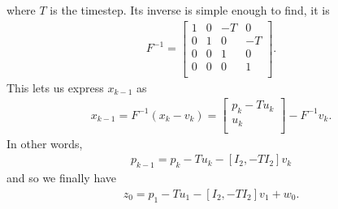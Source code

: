 \documentclass[]{article}
\begin{document}
where $T$ is the timestep. Its inverse is simple enough to find, it is
\begin{equation}\begin{aligned}
F^{-1} =
\begin{bmatrix}
1 & 0 & -T & 0 \\
0 & 1 & 0 & -T \\
0 & 0 & 1 & 0 \\
0 & 0 & 0 & 1 \\
\end{bmatrix}.
\end{aligned}\end{equation}
This lets us express $x_{k-1}$ as
\begin{equation}\begin{aligned}
x_{k-1} = F^{-1}(x_k - v_k) =
\begin{bmatrix}
p_k - Tu_k\\
u_k\\
\end{bmatrix}
- F^{-1}v_k.
\end{aligned}\end{equation}
In other words,
\begin{equation}\begin{aligned}
p_{k-1} = p_k - Tu_k - [I_2, -TI_2]v_k
\end{aligned}\end{equation}
and so we finally have
\begin{equation}\begin{aligned}
z_0 = p_1 - Tu_1 - [I_2, -TI_2]v_1 + w_0.
\end{aligned}\end{equation}
\end{document}
